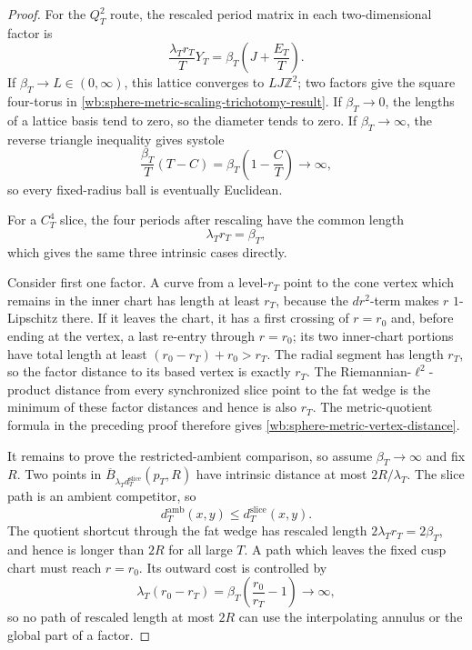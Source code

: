 \begin{proof}
For the \(Q_T^2\) route, the rescaled period matrix in each two-dimensional
factor is
\[
 \frac{\lambda_Tr_T}{T}Y_T
 =\beta_T\left(J+\frac{E_T}{T}\right).
\]
If \(\beta_T\to L\in(0,\infty)\), this lattice converges to
\(LJ\mathbb Z^2\); two factors give the square four-torus in
\eqref{wb:sphere-metric-scaling-trichotomy-result}.  If
\(\beta_T\to0\), the lengths of a lattice basis tend to zero, so the
diameter tends to zero.  If \(\beta_T\to\infty\), the reverse triangle
inequality gives systole
\[
 \frac{\beta_T}{T}(T-C)
 =\beta_T\left(1-\frac CT\right)\longrightarrow\infty,
\]
so every fixed-radius ball is eventually Euclidean.

For a \(C_T^4\) slice, the four periods after rescaling have the common
length
\[
 \lambda_Tr_T=\beta_T,
\]
which gives the same three intrinsic cases directly.

Consider first one factor.  A curve from a level-\(r_T\) point to the cone
vertex which remains in the inner chart has length at least \(r_T\), because
the \(dr^2\)-term makes \(r\) \(1\)-Lipschitz there.  If it leaves the
chart, it has a first crossing of \(r=r_0\) and, before ending at the
vertex, a last re-entry through \(r=r_0\); its two inner-chart portions
have total length at least
\((r_0-r_T)+r_0>r_T\).  The radial segment has length \(r_T\), so the
factor distance to its based vertex is exactly \(r_T\).  The
Riemannian-\(\ell^2\)-product distance from every synchronized slice point
to the fat wedge is the minimum of these factor distances and hence is
also \(r_T\).  The metric-quotient formula in the preceding proof therefore
gives \eqref{wb:sphere-metric-vertex-distance}.

It remains to prove the restricted-ambient comparison, so assume
\(\beta_T\to\infty\) and fix \(R\).  Two points in
\(\overline B_{\lambda_Td_T^{\mathrm{slice}}}(p_T,R)\) have intrinsic
distance at most \(2R/\lambda_T\).  The slice path is an ambient competitor,
so
\[
 d_T^{\mathrm{amb}}(x,y)\leq d_T^{\mathrm{slice}}(x,y).
\]
The quotient shortcut through the fat wedge has rescaled length
\(2\lambda_Tr_T=2\beta_T\), and hence is longer than \(2R\) for all large
\(T\).  A path which leaves the fixed cusp chart must reach \(r=r_0\).
Its outward cost is controlled by
\begin{equation}
 \lambda_T(r_0-r_T)
 =\beta_T\left(\frac{r_0}{r_T}-1\right)\longrightarrow\infty,
 \label{wb:sphere-metric-outward-shortcut-exclusion}
\end{equation}
so no path of rescaled length at most \(2R\) can use the interpolating
annulus or the global part of a factor.


\end{proof}

